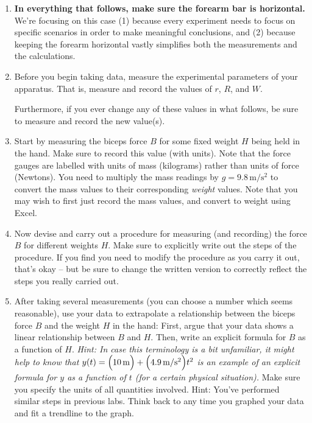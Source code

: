 \documentclass[11pt,letterpaper]{article}
\newcommand{\question}[2][blue]{\textcolor{#1}{#2}}
\renewcommand{\smans}[2]{#1\,\mathrm{#2}}
\renewcommand{\question}[2][]{#2}
\begin{document}
\begin{enumerate}[series=labproc,label={\bf \arabic*.},
		ref=\textcolor{black}{\arabic*}]

\item
{\bf In everything that follows, make sure the forearm bar is horizontal.}
We're focusing on this case 
(1) because every experiment needs to focus on specific scenarios in order to 
make meaningful conclusions,
and (2) because keeping the forearm horizontal vastly simplifies both the
measurements and the calculations.

\item 
Before you begin taking data,
measure the experimental parameters of your apparatus.
That is, measure and record the values of $r$, $R$, and $W$.

Furthermore, if you ever change any of these values in what follows,
be sure to measure and record the new value(s).  


\item
\question{Start by measuring the biceps force $B$ 
for some fixed weight $H$ being held in the hand.}
Make sure to record this value (with units).
Note that the force gauges are labelled with units of mass (kilograms) rather
than units of force (Newtons).  
You need to multiply the mass readings by $g=\smans{9.8}{m/s^2}$ 
to convert the mass values to
their corresponding \emph{weight} values.  Note that you may wish to first just
record the mass values, and convert to weight using Excel.

\item
Now devise and carry out a procedure for measuring (and recording)
the force $B$ for different weights $H$.  
\question{Make sure to explicitly write out the steps of the procedure.}
If you find you need to modify the procedure as you carry it out,
that's okay -- but be sure to change the written version to correctly
reflect the steps you really carried out.

\item
After taking several measurements (you can choose a number which seems
reasonable), use your data to 
\question{extrapolate a relationship between the biceps
force $B$ and the weight $H$ in the hand}:
First, argue that your data shows a linear relationship between $B$ and $H$.
\question{Then, write an explicit formula for $B$ as a function of $H$.}
\emph{Hint:  In case this terminology is a bit unfamiliar, 
it might help to know that
$y(t) = \Bigl( 10\,\mathrm{m} \Bigr) +\Bigl( 4.9\,\mathrm{m/s^2} \Bigr)t^2$ 
is an example of an explicit formula 
for $y$ as a function of $t$ (for a certain physical situation).}
Make sure you specify the units of all quantities involved.
Hint:  You've performed similar steps in previous labs.
Think back to any time you graphed your data 
and fit a trendline to the graph.


\end{enumerate}
\end{document}
